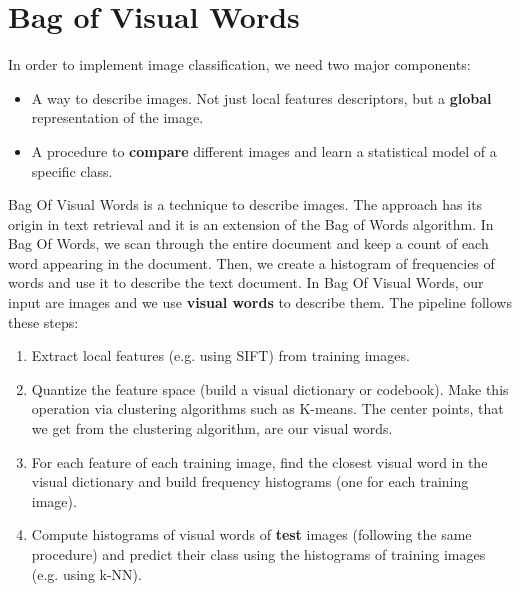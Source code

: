 \section{Bag of Visual Words}
In order to implement image classification, we need two major components:
\begin{itemize}
    \item A way to describe images. Not just local features descriptors, but a \textbf{global} representation of the image.
    \item A procedure to \textbf{compare} different images and learn a statistical model of a specific class. 
\end{itemize}
Bag Of Visual Words is a technique to describe images. The approach has its origin in text retrieval and it is an extension of the Bag of Words algorithm. In Bag Of Words, we scan through the entire document and keep a count of each word appearing in the document. Then, we create a histogram of frequencies of words and use it to describe the text document. In Bag Of Visual Words, our input are images and we use \textbf{visual words} to describe them.
\newline\newline
The pipeline follows these steps:
\begin{enumerate}
    \item Extract local features (e.g. using SIFT) from training images.
    \item Quantize the feature space (build a visual dictionary or codebook). Make this operation via clustering algorithms such as K-means. The center points, that we get from the clustering algorithm, are our visual words.
    \item For each feature of each training image, find the closest visual word in the visual dictionary and build frequency histograms (one for each training image).
    \item Compute histograms of visual words of \textbf{test} images (following the same procedure) and predict their class using the histograms of training images (e.g. using k-NN).
\end{enumerate}

